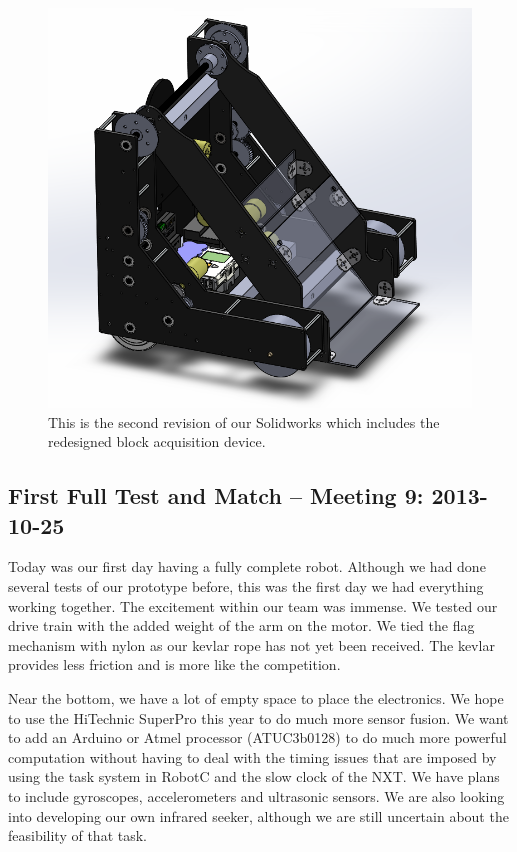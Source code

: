 \begin{center}
\begin{figure}[h]
\includegraphics[scale=0.75]{images/RobotV2.png}
\caption{This is the second revision of our Solidworks which includes the redesigned block acquisition device.}
\end{figure}
\end{center}

\newpage \subsection{First Full Test and Match -- Meeting 9: 2013-10-25}

Today was our first day having a fully complete robot. Although we had done several tests of our prototype before, this was the first day we had everything working together. The excitement within our team was immense. We tested our drive train with the added weight of the arm on the motor. We tied the flag mechanism with nylon as our kevlar rope has not yet been received. The kevlar provides less friction and is more like the competition.

Near the bottom, we have a lot of empty space to place the electronics. We hope to use the HiTechnic SuperPro this year to do much more sensor fusion. We want to add an Arduino or Atmel processor (ATUC3b0128) to do much more powerful computation without having to deal with the timing issues that are imposed by using the task system in RobotC and the slow clock of the NXT. We have plans to include gyroscopes, accelerometers and ultrasonic sensors. We are also looking into developing our own infrared seeker, although we are still uncertain about the feasibility of that task. 

